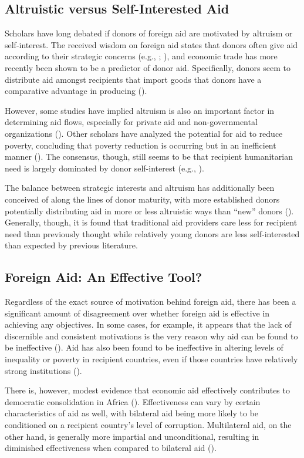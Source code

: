 \subsection*{Altruistic versus Self-Interested Aid}
Scholars have long debated if donors of foreign aid are motivated by altruism or self-interest. The received wisdom on foreign aid states that donors often give aid according to their strategic concerns (e.g., \cite{mckinlay1977}; \cite{alesina2000}), and economic trade has more recently been shown to be a predictor of donor aid. Specifically, donors seem to distribute aid amongst recipients that import goods that donors have a comparative advantage in producing (\cite{younas2008}).

However, some studies have implied altruism is also an important factor in determining aid flows, especially for private aid and non-governmental organizations (\cite{buthe2012}). Other scholars have analyzed the potential for aid to reduce poverty, concluding that poverty reduction is occurring but in an inefficient manner (\cite{collier2002}). The consensus, though, still seems to be that recipient humanitarian need is largely dominated by donor self-interest (e.g., \cite{hoeffler2011}).

The balance between strategic interests and altruism has additionally been conceived of along the lines of donor maturity, with more established donors potentially distributing aid in more or less altruistic ways than ``new'' donors (\cite{dreher2011}). Generally, though, it is found that traditional aid providers care less for recipient need than previously thought while relatively young donors are less self-interested than expected by previous literature.

\subsection*{Foreign Aid: An Effective Tool?}
Regardless of the exact source of motivation behind foreign aid, there has been a significant amount of disagreement over whether foreign aid is effective in achieving any objectives. In some cases, for example, it appears that the lack of discernible and consistent motivations is the very reason why aid can be found to be ineffective (\cite{collier2002}). Aid has also been found to be ineffective in altering levels of inequality or poverty in recipient countries, even if those countries have relatively strong institutions (\cite{chong2009a}).

There is, however, modest evidence that economic aid effectively contributes to democratic consolidation in Africa (\cite{dietrich2015a}). Effectiveness can vary by certain characteristics of aid as well, with bilateral aid being more likely to be conditioned on a recipient country's level of corruption. Multilateral aid, on the other hand, is generally more impartial and unconditional, resulting in diminished effectiveness when compared to bilateral aid (\cite{christensen2011}).

